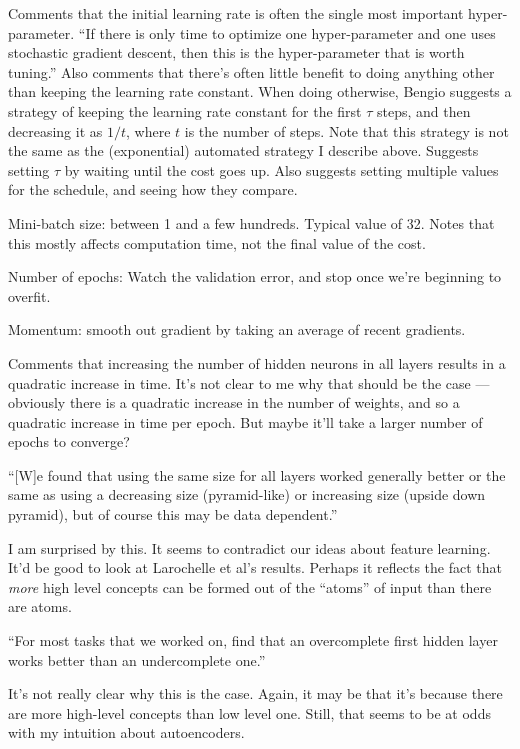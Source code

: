 \documentclass[12pt]{article}
\begin{document}
Comments that the initial learning rate is often the single most
important hyper-parameter.  ``If there is only time to optimize one
hyper-parameter and one uses stochastic gradient descent, then this is
the hyper-parameter that is worth tuning.''  Also comments that
there's often little benefit to doing anything other than keeping the
learning rate constant.  When doing otherwise, Bengio suggests a
strategy of keeping the learning rate constant for the first $\tau$
steps, and then decreasing it as $1/ t$, where $t$ is the number of
steps.  Note that this strategy is not the same as the (exponential)
automated strategy I describe above.  Suggests setting $\tau$ by
waiting until the cost goes up.  Also suggests setting multiple values
for the schedule, and seeing how they compare.

Mini-batch size: between 1 and a few hundreds.  Typical value of 32.
Notes that this mostly affects computation time, not the final value
of the cost.

Number of epochs: Watch the validation error, and stop once we're
beginning to overfit.

Momentum: smooth out gradient by taking an average of recent
gradients.

Comments that increasing the number of hidden neurons in all layers
results in a quadratic increase in time.  It's not clear to me why
that should be the case --- obviously there is a quadratic increase in
the number of weights, and so a quadratic increase in time per epoch.
But maybe it'll take a larger number of epochs to converge?

``[W]e found that using the same size for all layers worked generally
better or the same as using a decreasing size (pyramid-like) or
increasing size (upside down pyramid), but of course this may be data
dependent.''

I am surprised by this.  It seems to contradict our ideas about
feature learning.  It'd be good to look at Larochelle et al's results.
Perhaps it reflects the fact that \emph{more} high level concepts can
be formed out of the ``atoms'' of input than there are atoms.

``For most tasks that we worked on, find that an overcomplete first
hidden layer works better than an undercomplete one.''

It's not really clear why this is the case.  Again, it may be that
it's because there are more high-level concepts than low level one.
Still, that seems to be at odds with my intuition about autoencoders.
\end{document}
